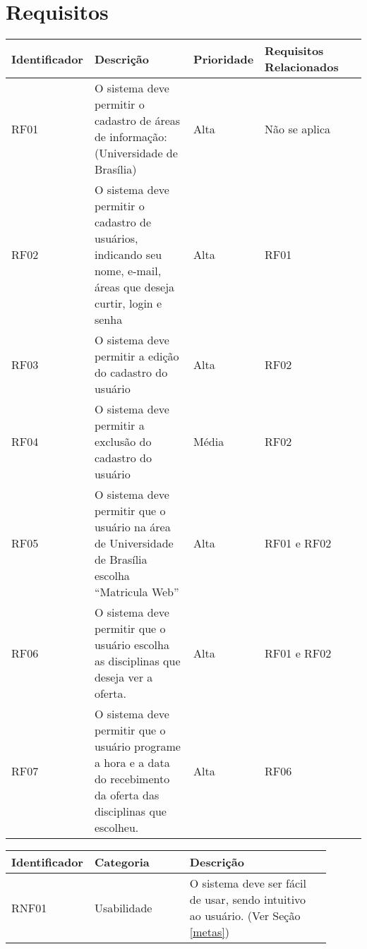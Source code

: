\chapter[Requisitos]{Requisitos}

\begin{table*}[!h]
\caption{Requisitos Funcionais}
\label{Rotulo}
  \begin{tabular}{p{0.15\linewidth}p{0.45\linewidth}p{0.15\linewidth}p{0.15\linewidth}p{0.15\linewidth}}
  \hline
  Identificador & Descrição & Prioridade & Requisitos Relacionados \\
  \hline

  RF01 & O sistema deve permitir o cadastro de áreas de informação: (Universidade de Brasília) & Alta & Não se aplica\\

  RF02 & O sistema deve permitir o cadastro de usuários, indicando seu nome, e-mail, áreas que deseja curtir, login e senha & Alta & RF01\\

  RF03 & O sistema deve permitir a edição do cadastro do usuário & Alta & RF02\\

  RF04 & O sistema deve permitir a exclusão do cadastro do usuário & Média & RF02\\

  RF05 & O sistema deve permitir que o usuário na área de Universidade de Brasília escolha “Matricula Web” & Alta & RF01 e RF02\\

  RF06 & O sistema deve permitir que o usuário escolha as disciplinas que deseja ver a oferta. & Alta & RF01 e RF02\\

  RF07 & O sistema deve permitir que o usuário programe a hora e a data do recebimento da oferta das disciplinas que escolheu. & Alta & RF06\\

  \hline
  \end{tabular}
% 
\caption{Requisitos Não Funcionais}
\label{Rotulo2}
  \begin{tabular}{p{0.15\linewidth}p{0.30\linewidth}p{0.45\linewidth}}
  \hline
  Identificador & Categoria & Descrição\\
  \hline

  RNF01 & Usabilidade & O sistema deve ser fácil de usar, sendo intuitivo ao usuário. (Ver Seção \ref{metas})\\


\end{tabular}
\end{table*}
